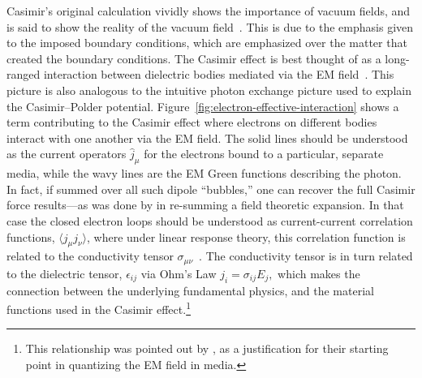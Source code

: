 Casimir's original calculation vividly shows the importance of vacuum fields, and is said to show the reality 
of the vacuum field~\citep{Jaffe2005}.  This is due to the emphasis given to the imposed boundary conditions,
which are emphasized over the matter that created the boundary conditions.  
The Casimir effect is best thought of as a long-ranged interaction between dielectric bodies 
mediated via the EM field~\citep{Jaffe2005, Rahi2009}.  This picture is also
analogous to the intuitive photon exchange picture used to explain the Casimir--Polder potential.
  Figure~\ref{fig:electron-effective-interaction} shows a term contributing to the Casimir effect where 
electrons on different bodies interact with one another via the EM field.
  The solid lines should
be understood as the current operators $\hat{j}_\mu$ for the electrons bound to a particular, separate media, while the 
wavy lines are the EM Green functions describing the photon.  In fact, if summed over all such dipole ``bubbles,''
one can recover the full Casimir force results---as was done by \citet{Dzyaloshinskii1961} in re-summing a field 
theoretic expansion.  
In that case the closed electron loops should be understood as current-current correlation functions,
$\langle j_\mu j_\nu\rangle$, where under linear response theory, this correlation function is related to the conductivity
tensor $\sigma_{\mu\nu}$~\citep{Kubo1957,Altland2011}.  The conductivity tensor is in turn related to the dielectric tensor, $\epsilon_{ij}$
via Ohm's Law $j_i=\sigma_{ij}E_j,$ which makes the connection between the underlying fundamental physics,
and the material functions used in the Casimir effect.\footnote{
  This relationship was pointed out by \citet{Rahi2009}, as a justification for their starting point
  in quantizing the EM field in media.}


